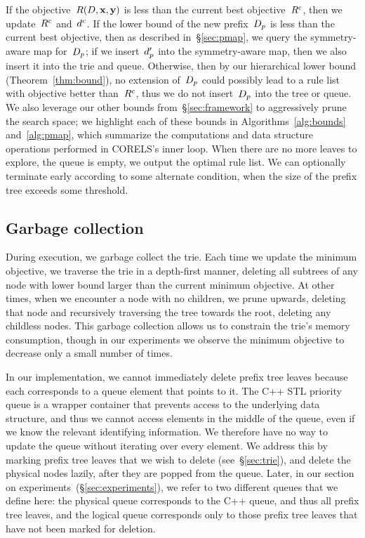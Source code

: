 If the objective~$R({D}, \mathbf{x}, \mathbf{y})$ is less than the current best objective~${R^c}$,
then we update~${R^c}$ and~$d^c$.
%
If the lower bound of the new prefix~$D_p$ is less than the current best objective,
then as described in~\S\ref{sec:pmap}, we query the symmetry-aware map for~$D_p$;
if we insert~$d_p'$ into the symmetry-aware map, then we also insert it into the trie and queue.
%
Otherwise, %
then by our hierarchical lower bound (Theorem~\ref{thm:bound}),
no extension of~$D_p$ could possibly lead to a rule list with objective
better than~${R^c}$, thus we do not insert~$D_p$ into the tree or queue.
%
We also leverage our other bounds from~\S\ref{sec:framework}
to aggressively prune the search space; we highlight each of these bounds
in Algorithms~\ref{alg:bounds} and~\ref{alg:pmap},
which summarize the computations and data structure operations performed in CORELS's inner loop.
%
When there are no more leaves to explore, \ie the queue is empty, we output the optimal rule list.
%
We can optionally terminate early according to some alternate condition,
\eg when the size of the prefix tree exceeds some threshold.

\subsection{Garbage collection}
\label{sec:gc}

During execution, we garbage collect the trie.
%
Each time we update the minimum objective,
we traverse the trie in a depth-first manner, deleting all subtrees
of any node with lower bound larger than the current minimum objective.
%
At other times, when we encounter a node with no children, we prune upwards,
deleting that node and recursively traversing the tree towards the root,
deleting any childless nodes.
%
This garbage collection allows us to constrain the trie's memory consumption, though in our
experiments we observe the minimum objective to decrease only a small number of times.

In our implementation, we cannot immediately delete prefix tree leaves
because each corresponds to a queue element that points to it.
%
The C++ STL priority queue is a wrapper container that prevents access to the
underlying data structure, and thus we cannot access elements in the middle of the queue,
even if we know the relevant identifying information.
%
We therefore have no way to update the queue without iterating over every element.
%
We address this by marking prefix tree leaves that we wish to delete (see~\S\ref{sec:trie}),
and delete the physical nodes lazily, after they are popped from the queue.
%
Later, in our section on experiments~(\S\ref{sec:experiments}),
we refer to two different queues that we define here: the physical queue
corresponds to the C++ queue, and thus all prefix tree leaves, and the logical queue
corresponds only to those prefix tree leaves that have not been marked for deletion.

